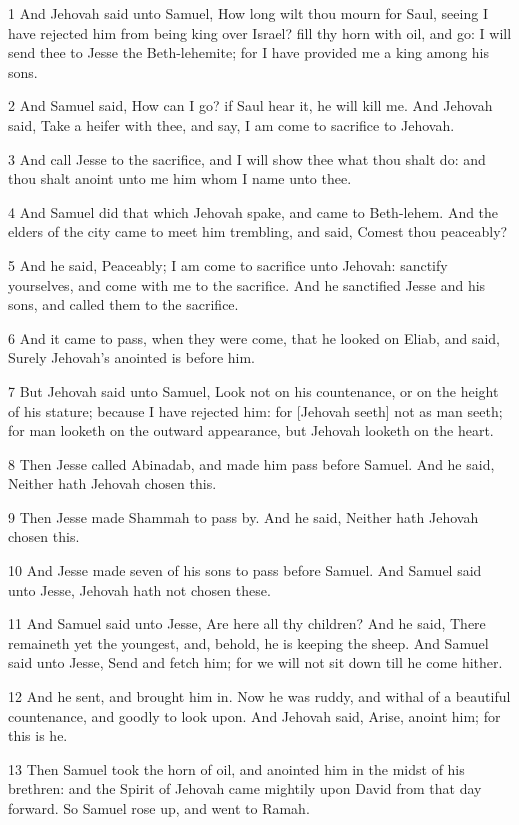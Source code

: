 \par 1 And Jehovah said unto Samuel, How long wilt thou mourn for Saul, seeing I have rejected him from being king over Israel? fill thy horn with oil, and go: I will send thee to Jesse the Beth-lehemite; for I have provided me a king among his sons.
\par 2 And Samuel said, How can I go? if Saul hear it, he will kill me. And Jehovah said, Take a heifer with thee, and say, I am come to sacrifice to Jehovah.
\par 3 And call Jesse to the sacrifice, and I will show thee what thou shalt do: and thou shalt anoint unto me him whom I name unto thee.
\par 4 And Samuel did that which Jehovah spake, and came to Beth-lehem. And the elders of the city came to meet him trembling, and said, Comest thou peaceably?
\par 5 And he said, Peaceably; I am come to sacrifice unto Jehovah: sanctify yourselves, and come with me to the sacrifice. And he sanctified Jesse and his sons, and called them to the sacrifice.
\par 6 And it came to pass, when they were come, that he looked on Eliab, and said, Surely Jehovah's anointed is before him.
\par 7 But Jehovah said unto Samuel, Look not on his countenance, or on the height of his stature; because I have rejected him: for [Jehovah seeth] not as man seeth; for man looketh on the outward appearance, but Jehovah looketh on the heart.
\par 8 Then Jesse called Abinadab, and made him pass before Samuel. And he said, Neither hath Jehovah chosen this.
\par 9 Then Jesse made Shammah to pass by. And he said, Neither hath Jehovah chosen this.
\par 10 And Jesse made seven of his sons to pass before Samuel. And Samuel said unto Jesse, Jehovah hath not chosen these.
\par 11 And Samuel said unto Jesse, Are here all thy children? And he said, There remaineth yet the youngest, and, behold, he is keeping the sheep. And Samuel said unto Jesse, Send and fetch him; for we will not sit down till he come hither.
\par 12 And he sent, and brought him in. Now he was ruddy, and withal of a beautiful countenance, and goodly to look upon. And Jehovah said, Arise, anoint him; for this is he.
\par 13 Then Samuel took the horn of oil, and anointed him in the midst of his brethren: and the Spirit of Jehovah came mightily upon David from that day forward. So Samuel rose up, and went to Ramah.
